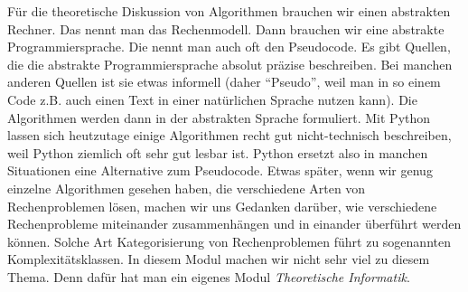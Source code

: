 \begin{bem} Für die theoretische Diskussion von Algorithmen brauchen wir einen abstrakten Rechner. Das nennt man das Rechenmodell. Dann brauchen wir eine abstrakte Programmiersprache. Die nennt man auch oft den Pseudocode. Es gibt Quellen, die die abstrakte Programmiersprache absolut präzise beschreiben. Bei manchen anderen Quellen ist sie etwas informell (daher ``Pseudo'', weil man in so einem Code z.B. auch einen Text in einer natürlichen Sprache nutzen kann). Die Algorithmen werden dann in der abstrakten Sprache formuliert. Mit Python lassen sich heutzutage einige Algorithmen recht gut nicht-technisch beschreiben, weil Python ziemlich oft sehr gut lesbar ist. Python ersetzt also in manchen Situationen eine Alternative zum Pseudocode. Etwas später, wenn wir genug einzelne Algorithmen gesehen haben, die verschiedene Arten von Rechenproblemen lösen, machen wir uns Gedanken darüber, wie verschiedene Rechenprobleme miteinander zusammenhängen und in einander überführt werden können. Solche Art Kategorisierung von Rechenproblemen führt zu sogenannten Komplexitätsklassen. In diesem Modul machen wir nicht sehr viel zu diesem Thema. Denn dafür hat man ein eigenes Modul \emph{Theoretische Informatik}. 
\end{bem} 

